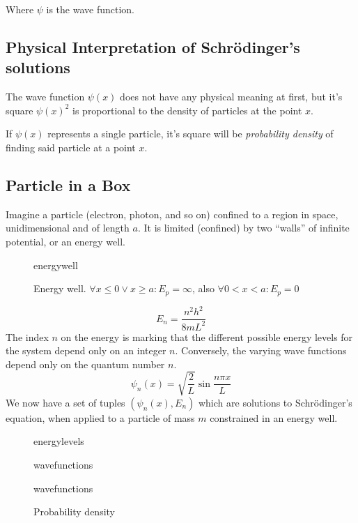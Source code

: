 \documentclass{article}[10pt]
\begin{document}
Where $\psi$ is the wave function.

\subsection{Physical Interpretation of Schrödinger's solutions}
The wave function $\psi(x)$ does not have any physical meaning at first, but
it's square $\psi{(x)}^2$ is proportional to the density of particles at the point
$x$.

If $\psi(x)$ represents a single particle, it's square will be \emph{probability density}
of finding said particle at a point $x$.

\subsection{Particle in a Box}
Imagine a particle (electron, photon, and so on) confined to a region in space,
unidimensional and of length $a$. It is limited (confined) by two ``walls'' of
infinite potential, or an energy well.
\begin{figure}
	{energywell}
	\caption{Energy well. $\forall x\le 0 \vee x\ge a : E_p=\infty$, also $\forall 0<x<a : E_p=0 $}\label{fig:energywell}
\end{figure}
\begin{equation*}
	E_n=\frac{n^2h^2}{8mL^2}
\end{equation*}
The index $n$ on the energy is marking that the different possible energy levels
for the system depend only on an integer $n$. Conversely, the varying wave
functions depend only on the quantum number $n$.
\begin{equation*}
	\psi_n(x) = \sqrt{\frac{2}{L}}\sin{\frac{n\pi x}{L}}
\end{equation*}
We now have a set of tuples $(\psi_n(x), E_n)$ which are solutions to
Schrödinger's equation, when applied to a particle of mass $m$ constrained in an
energy well.
\begin{figure}
	\centering
	\begin{minipage}[.5\textwidth]
		\centering
		{energylevels}
		\label{fig:energylevels}
	\end{minipage}%
	\begin{minipage}[.5\textwidth]
		\centering
		{wavefunctions}
		\label{fig:wavefunctions}
	\end{minipage}
\end{figure}
\begin{figure}
	{wavefunctions}
	\caption{Probability density}
\end{figure}
\end{document}
